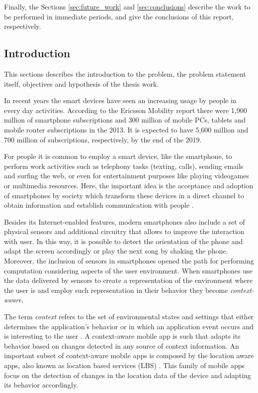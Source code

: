 Finally, the Sections \ref{sec:future_work} and \ref{sec:conclusions} describe the work to be performed in immediate periods, and give the conclusions of this report, respectively.

\subsection{Introduction}
\label{sub:introduction}
This sections describes the introduction to the problem, the problem statement itself, objectives and hypothesis of the thesis work.

In recent years the smart devices have seen an increasing usage by people in every day activities.
According to the Ericsson Mobility report \cite{Qureshi2014} there were 1,900 million of smartphone subscriptions and 300 million of mobile PCs, tablets and mobile router subscriptions in the 2013.
It is expected to have 5,600 million and 700 million of subscriptions, respectively, by the end of the 2019.


For people it is common to employ a smart device, like the smartphone, to perform work activities such as telephony tasks (texting, calls), sending emails and surfing the web, or even for entertainment purposes like playing videogames or multimedia resources. 
Here, the important idea is the acceptance and adoption of smartphones by society which transform these devices in a direct channel to obtain information and establish communication with people \cite{Perez-Torres2012a}.


Besides its Internet-enabled features, modern smartphones also include a set of physical sensors and additional circuitry that allows to improve the interaction with user. In this way, it is possible to detect the orientation of the phone and adapt the screen accordingly or play the next song by shaking the phone.
Moreover, the inclusion of sensors in smartphones opened the path for performing computation considering aspects of the user environment. When smartphones use the data delivered by sensors to create a representation of the environment where the user is and employ such representation in their behavior they become \emph{context-aware}.


The term \emph{context} refers to the set of environmental states and settings that either determines the application’s behavior or in which an application event occurs and is interesting to the user \cite{Chen2000}.
A context-aware mobile app is such that adapts its behavior based on changes detected in any source of context information.
An important subset of context-aware mobile apps is composed by the location aware apps, also known as location based services (LBS) \cite{Zhuang2010,Kjaergaard2012}. 
This family of mobile apps focus on the detection of changes in the location data of the device and adapting its behavior accordingly.


